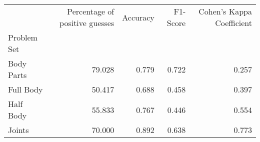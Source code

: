 \begin{table}
      \caption[]{}
      \label{}
      \begin{tabular}{lrrrr}
\hline
{} &  Percentage of positive guesses &  Accuracy &  F1-Score &  Cohen's Kappa Coefficient \\
Problem Set   &                                 &           &           &                            \\
\hline
Body Parts &                          79.028 &     0.779 &     0.722 &                      0.257 \\
Full Body  &                          50.417 &     0.688 &     0.458 &                      0.397 \\
Half Body  &                          55.833 &     0.767 &     0.446 &                      0.554 \\
Joints     &                          70.000 &     0.892 &     0.638 &                      0.773 \\
\hline
\end{tabular}
\end{table}